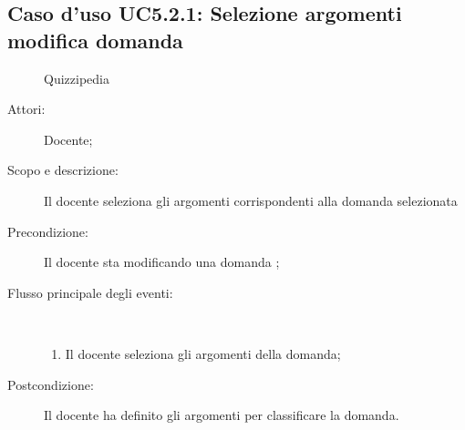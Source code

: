 \subsection{Caso d'uso UC5.2.1: Selezione argomenti modifica domanda}
	\begin{figure}[H]
		\centering
		\begin{resizedtikzpicture}{\textwidth}
		\begin{umlsystem}[x=0, fill=lightgray!20]{Quizzipedia}
		\end{umlsystem}
		\end{resizedtikzpicture}
		\caption{}
	\end{figure}
\begin{description}
\item[Attori:] Docente;
\item[Scopo e descrizione:] Il docente seleziona gli argomenti corrispondenti alla domanda selezionata
      \item[Precondizione:] Il docente sta modificando una domanda
;

        \item[Flusso principale degli eventi:] \ 
 \begin{enumerate}
          \item Il docente seleziona gli argomenti della domanda;

      \end{enumerate}
    \item[Postcondizione:] Il docente ha definito gli argomenti per classificare la domanda.
  \end{description}
\hypertarget{UC5.2.2}{}
